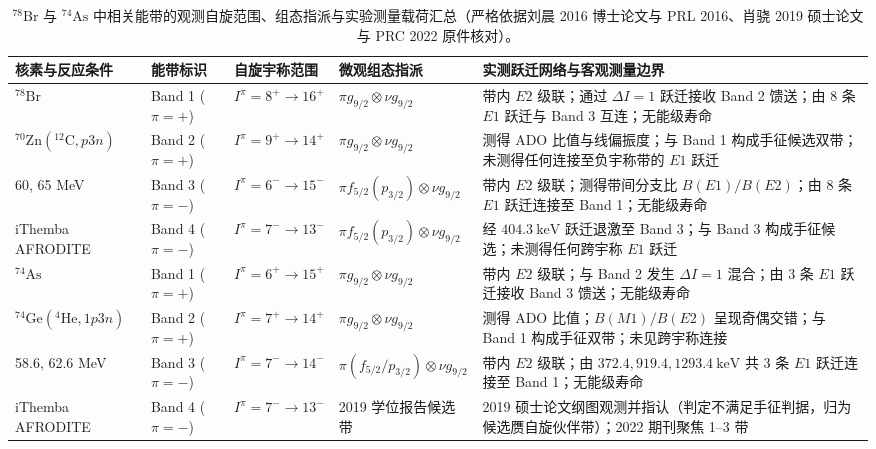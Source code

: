 \begin{table}[!htbp]
\centering
\small
\caption{$^{78}\mathrm{Br}$ 与 $^{74}\mathrm{As}$ 中相关能带的观测自旋范围、组态指派与实验测量载荷汇总（严格依据刘晨 2016 博士论文与 PRL 2016、肖骁 2019 硕士论文与 PRC 2022 原件核对）。}\label{tab:4-5-bands-summary}
\begin{tabularx}{\textwidth}{llp{2.6cm}p{3.2cm}X}
\hline\hline
核素与反应条件 & 能带标识 & 自旋宇称范围 & 微观组态指派 & 实测跃迁网络与客观测量边界 \\
\hline
$^{78}\mathrm{Br}$ & Band 1 ($\pi=+$) & $I^\pi = 8^+ \to 16^+$ & $\pi g_{9/2} \otimes \nu g_{9/2}$ & 带内 $E2$ 级联；通过 $\Delta I=1$ 跃迁接收 Band 2 馈送；由 8 条 $E1$ 跃迁与 Band 3 互连；无能级寿命 \\
$^{70}\mathrm{Zn}(^{12}\mathrm{C}, p3n)$ & Band 2 ($\pi=+$) & $I^\pi = 9^+ \to 14^+$ & $\pi g_{9/2} \otimes \nu g_{9/2}$ & 测得 ADO 比值与线偏振度；与 Band 1 构成手征候选双带；未测得任何连接至负宇称带的 $E1$ 跃迁 \\
60, 65 MeV & Band 3 ($\pi=-$) & $I^\pi = 6^- \to 15^-$ & $\pi f_{5/2}(p_{3/2}) \otimes \nu g_{9/2}$ & 带内 $E2$ 级联；测得带间分支比 $B(E1)/B(E2)$；由 8 条 $E1$ 跃迁连接至 Band 1；无能级寿命 \\
iThemba AFRODITE & Band 4 ($\pi=-$) & $I^\pi = 7^- \to 13^-$ & $\pi f_{5/2}(p_{3/2}) \otimes \nu g_{9/2}$ & 经 $404.3\ \mathrm{keV}$ 跃迁退激至 Band 3；与 Band 3 构成手征候选；未测得任何跨宇称 $E1$ 跃迁 \\
\hline
$^{74}\mathrm{As}$ & Band 1 ($\pi=+$) & $I^\pi = 6^+ \to 15^+$ & $\pi g_{9/2} \otimes \nu g_{9/2}$ & 带内 $E2$ 级联；与 Band 2 发生 $\Delta I=1$ 混合；由 3 条 $E1$ 跃迁接收 Band 3 馈送；无能级寿命 \\
$^{74}\mathrm{Ge}(^4\mathrm{He}, 1p3n)$ & Band 2 ($\pi=+$) & $I^\pi = 7^+ \to 14^+$ & $\pi g_{9/2} \otimes \nu g_{9/2}$ & 测得 ADO 比值；$B(M1)/B(E2)$ 呈现奇偶交错；与 Band 1 构成手征双带；未见跨宇称连接 \\
58.6, 62.6 MeV & Band 3 ($\pi=-$) & $I^\pi = 7^- \to 14^-$ & $\pi(f_{5/2}/p_{3/2}) \otimes \nu g_{9/2}$ & 带内 $E2$ 级联；由 $372.4, 919.4, 1293.4\ \mathrm{keV}$ 共 3 条 $E1$ 跃迁连接至 Band 1；无能级寿命 \\
iThemba AFRODITE & Band 4 ($\pi=-$) & $I^\pi = 7^- \to 13^-$ & 2019 学位报告候选带 & 2019 硕士论文纲图观测并指认（判定不满足手征判据，归为候选赝自旋伙伴带）；2022 期刊聚焦 1--3 带 \\
\hline\hline
\end{tabularx}
\end{table}


